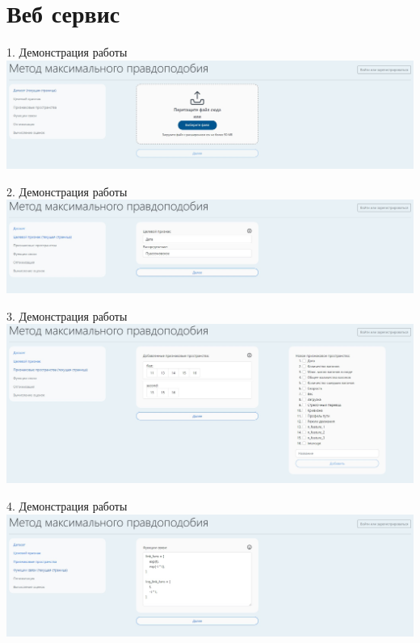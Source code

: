 \documentclass[aspectratio=169]{beamer}
\begin{document}
    \section{Веб сервис}
    \begin{frame}{1. Демонстрация работы}
        \centering
        \includegraphics[width=2.05\textheight]{src/web/1.jpg}
    \end{frame}
    \begin{frame}{2. Демонстрация работы}
        \centering
        \includegraphics[width=2.05\textheight]{src/web/2.jpg}
    \end{frame}
    \begin{frame}{3. Демонстрация работы}
        \centering
        \includegraphics[width=1.75\textheight]{src/web/3.jpg}
    \end{frame}
    \begin{frame}{4. Демонстрация работы}
        \centering
        \includegraphics[width=2.0\textheight]{src/web/4.jpg}
    \end{frame}
\end{document}
